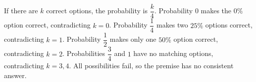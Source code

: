 If there are $k$ correct options, the probability is $\dfrac{k}{4}$. Probability $0$ makes the $0\%$ option correct, contradicting $k=0$. Probability $\dfrac{1}{4}$ makes two $25\%$ options correct, contradicting $k=1$. Probability $\dfrac{1}{2}$ makes only one $50\%$ option correct, contradicting $k=2$. Probabilities $\dfrac{3}{4}$ and $1$ have no matching options, contradicting $k=3,4$. All possibilities fail, so the premise has no consistent answer.
